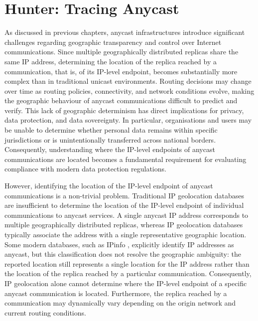 \chapter{Hunter: Tracing Anycast}
\label{ch:hunter}

As discussed in previous chapters, anycast infrastructures introduce significant challenges regarding geographic transparency and control over Internet communications. Since multiple geographically distributed replicas share the same IP address, determining the location of the replica reached by a communication, that is, of its IP-level endpoint, becomes substantially more complex than in traditional unicast environments. Routing decisions may change over time as routing policies, connectivity, and network conditions evolve, making the geographic behaviour of anycast communications difficult to predict and verify. This lack of geographic determinism has direct implications for privacy, data protection, and data sovereignty. In particular, organisations and users may be unable to determine whether personal data remains within specific jurisdictions or is unintentionally transferred across national borders. Consequently, understanding where the IP-level endpoints of anycast communications are located becomes a fundamental requirement for evaluating compliance with modern data protection regulations.

However, identifying the location of the IP-level endpoint of anycast communications is a non-trivial problem. Traditional IP geolocation databases are insufficient to determine the location of the IP-level endpoint of individual communications to anycast services. A single anycast IP address corresponds to multiple geographically distributed replicas, whereas IP geolocation databases typically associate the address with a single representative geographic location. Some modern databases, such as IPinfo \cite{IPIPinfo}, explicitly identify IP addresses as anycast, but this classification does not resolve the geographic ambiguity: the reported location still represents a single location for the IP address rather than the location of the replica reached by a particular communication. Consequently, IP geolocation alone cannot determine where the IP-level endpoint of a specific anycast communication is located. Furthermore, the replica reached by a communication may dynamically vary depending on the origin network and current routing conditions.

